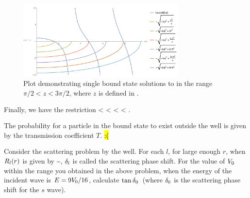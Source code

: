 \begin{solution}
	\begin{figure} \centering
		\includegraphics[width=0.75\textwidth]{plot2}
		\caption{Plot demonstrating single bound state solutions to  in the range $\pi/2 < z < 3\pi/2$, where $z$ is defined in .}
		\label{plot2}
	\end{figure}
	
	Finally, we have the restriction
	\beqn \label{range}
		 <  < 
		\qimplies
		 < \Vo < .
	\eeqn
	
	The probability for a particle in the bound state to exist outside the well is given by the transmission coefficient $T$.  \hl{:(}
\end{solution}



\begin{problem}
	Consider the scattering problem by the well.  For each $l$, for large enough $r$, when $R_l(r)$ is given by
	\beqn \label{outside}
		\Rlr \sim \Al {},
	\eeqn
	$\delta_l$ is called the scattering phase shift.  For the value of $V_0$ within the range you obtained in the above problem, when the energy of the incident wave is $E = 9 V_0 / 16$, calculate $\tan\delta_0$~(where $\delta_0$ is the scattering phase shift for the $s$ wave).
\end{problem}

